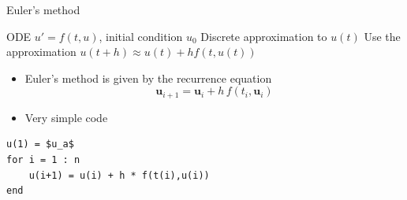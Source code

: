\documentclass[10pt]{beamer}
\begin{document}
\begin{frame}[fragile]{Euler's method}

{ODE $u'=f(t,u)$, initial condition $u_0$}
{Discrete approximation to $u(t)$}
{Use the approximation $u(t+h)\approx u(t) + h f(t,u(t))$}

\begin{itemize}
    \item Euler's method is given by the recurrence equation 
        $$
        \textbf{u}_{i+1} = \textbf{u}_i + h\,f(t_i, \textbf{u}_i )
        $$
    \item Very simple code
\end{itemize}
\begin{lstlisting}[mathescape,label=algo]
u(1) = $u_a$
for i = 1 : n
    u(i+1) = u(i) + h * f(t(i),u(i))
end
\end{lstlisting}
\end{frame}
\end{document}
